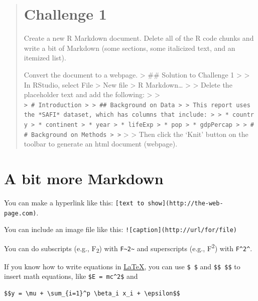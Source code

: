 \documentclass[]{book}
\begin{document}
\begin{quote}
\section{Challenge 1}\label{challenge-1-1}

Create a new R Markdown document. Delete all of the R code chunks and
write a bit of Markdown (some sections, some italicized text, and an
itemized list).

Convert the document to a webpage. \textgreater{} \#\# Solution to
Challenge 1 \textgreater{} \textgreater{} In RStudio, select File
\textgreater{} New file \textgreater{} R Markdown\ldots{} \textgreater{}
\textgreater{} Delete the placeholder text and add the following:
\textgreater{} \textgreater{}
\texttt{\textgreater{}\ \#\ Introduction\ \textgreater{}\ \textgreater{}\ \#\#\ Background\ on\ Data\ \textgreater{}\ \textgreater{}\ This\ report\ uses\ the\ *SAFI*\ dataset,\ which\ has\ columns\ that\ include:\ \textgreater{}\ \textgreater{}\ *\ country\ \textgreater{}\ *\ continent\ \textgreater{}\ *\ year\ \textgreater{}\ *\ lifeExp\ \textgreater{}\ *\ pop\ \textgreater{}\ *\ gdpPercap\ \textgreater{}\ \textgreater{}\ \#\#\ Background\ on\ Methods\ \textgreater{}\ \textgreater{}}
\textgreater{} \textgreater{} Then click the `Knit' button on the
toolbar to generate an html document (webpage).
\end{quote}

\section{A bit more Markdown}\label{a-bit-more-markdown}

You can make a hyperlink like this:
\texttt{{[}text\ to\ show{]}(http://the-web-page.com)}.

You can include an image file like this:
\texttt{!{[}caption{]}(http://url/for/file)}

You can do subscripts (e.g., F\textsubscript{2}) with
\texttt{F\textasciitilde{}2\textasciitilde{}} and superscripts (e.g.,
F\textsuperscript{2}) with \texttt{F\^{}2\^{}}.

If you know how to write equations in
\href{http://www.latex-project.org/}{LaTeX}, you can use \texttt{\$\ \$}
and \texttt{\$\$\ \$\$} to insert math equations, like
\texttt{\$E\ =\ mc\^{}2\$} and

\begin{verbatim}
$$y = \mu + \sum_{i=1}^p \beta_i x_i + \epsilon$$
\end{verbatim}
\end{document}
